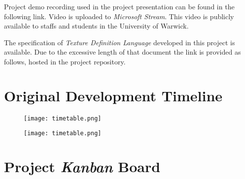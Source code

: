 \documentclass[oneside, a4paper]{report}
\begin{document}
    Project demo recording used in the project presentation can be found in the following link. Video is uploaded to \textit{Microsoft Stream}. This video is publicly available to staffs and students in the University of Warwick.
    
    \begin{center}
    \end{center}

    The specification of \textit{Texture Definition Language} developed in this project is available. Due to the excessive length of that document the link is provided as follows, hosted in the project repository.

    \begin{center}
    \end{center}

    \chapter{Original Development Timeline}
    \label{original_timeline}

    \begin{figure}[H]
        \texttt{[image: timetable.png]}
    \end{figure}

    \begin{figure}[H]
        \texttt{[image: timetable.png]}
    \end{figure}

    \chapter{Project \textit{Kanban} Board}
    \label{project_kanban}
\end{document}
